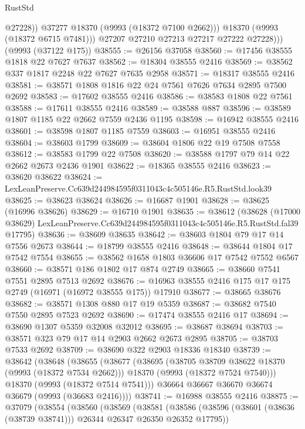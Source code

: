 \begin{lexlean}{RustStd}
\begin{coremodule}
                  @27228))
              @37277
              @18370
              (@9993 (@18372 @7100 @2662)))
            @18370
            (@9993 (@18372 @6715 @7481)))
          @27207
          @27210
          @27213
          @27217
          @27222
          @27228)))
    (@9993 (@37122 @175))
@38555 := @26156 @37058
@38560 := @17456 @38555 @1818 @22 @7627 @7637
@38562 := @18304 @38555 @2416
@38569 := @38562 @337 @1817 @2248 @22 @7627 @7635 @2958
@38571 := @18317 @38555 @2416
@38581 := @38571 @1808 @1816 @22 @24 @7561 @7626 @7634 @2895 @7500 @2692
@38583 := @17602 @38555 @2416
@38586 := @38583 @1808 @22 @7561
@38588 := @17611 @38555 @2416
@38589 := @38588 @887
@38596 := @38589 @1807 @1185 @22 @2662 @7559 @2436 @1195
@38598 := @16942 @38555 @2416
@38601 := @38598 @1807 @1185 @7559
@38603 := @16951 @38555 @2416
@38604 := @38603 @1799
@38609 := @38604 @1806 @22 @19 @7508 @7558
@38612 := @38583 @1799 @22 @7508
@38620 := @38588 @1797 @79 @14 @22 @2662 @2673 @2436 @1901
@38622 := @18365 @38555 @2416
@38623 := @38620 @38622
@38624 := LexLeanPreserve.Cc639d244984595f0311043c4c505146e.R5.RustStd.look39
@38625 := @38623 @38624
@38626 := @16687 @1901
@38628 := @38625 (@16996 @38626)
@38629 := @16710 @1901
@38635 := @38612
    (@38628
      (@17000 @38629)
      LexLeanPreserve.Cc639d244984595f0311043c4c505146e.R5.RustStd.fal39
      @17795)
@38636 := @38609 @38635
@38642 := @38603 @1804 @79 @17 @14 @7556 @2673
@38644 := @18799 @38555 @2416
@38648 := @38644 @1804 @17 @7542 @7554
@38655 := @38562 @1658 @1803 @36606 @17 @7542 @7552 @6567
@38660 := @38571 @186 @1802 @17 @874 @2749
@38665 := @38660 @7541 @7551 @2895 @7513 @2692
@38676 := @16963 @38555 @2416 @175 @17 @175 @2749 (@16971 (@16972 @38555 @175)) @17910
@38677 := @38665 @38676
@38682 := @38571 @1308 @880 @17 @19 @5359
@38687 := @38682 @7540 @7550 @2895 @7523 @2692
@38690 := @17474 @38555 @2416 @17
@38694 := @38690 @1307 @5359 @32008 @32012
@38695 := @38687 @38694
@38703 := @38571 @323 @79 @17 @14 @2903 @2662 @2673 @2895
@38705 := @38703 @7533 @2692
@38709 := @38690 @322 @2903 @18336 @18340
@38739 := @38642
    (@38648
      (@38655
        (@38677
          (@38695
            (@38705 @38709 @38622 @18370 (@9993 (@18372 @7534 @2662)))
            @18370
            (@9993 (@18372 @7524 @7540)))
          @18370
          (@9993 (@18372 @7514 @7541)))
        @36664
        @36667
        @36670
        @36674
        @36679
        (@9993 (@36683 @2416))))
@38741 := @16988 @38555 @2416
@38875 := @37079
    (@38554
      (@38560
        (@38569
          (@38581
            (@38586 (@38596 (@38601 (@38636 (@38739 @38741))) @26344 @26347 @26350 @26352 @17795))

\end{coremodule}
\end{lexlean}

